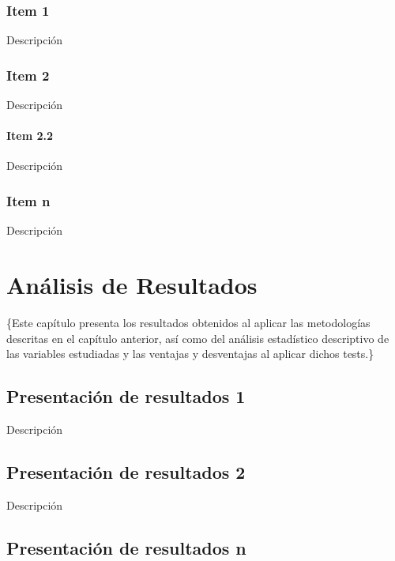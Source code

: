 \documentclass[oneside,11pt]{Latex/Classes/PhDthesisPSnPDF}
\begin{document}
\subsection{Item 1}

Descripción\\

\subsection{Item 2}

Descripción\\

\subsubsection{Item 2.2}

Descripción\\

\subsection{Item n}

Descripción\\

\chapter{Análisis de Resultados}

\{\small Este capítulo presenta los resultados obtenidos al aplicar las
metodologías descritas en el capítulo anterior, así como del análisis
estadístico descriptivo de las variables estudiadas y las ventajas y
desventajas al aplicar dichos tests.\}

\section{Presentación de resultados 1}

Descripción\\

\section{Presentación de resultados 2}

Descripción\\

\section{Presentación de resultados n}
\end{document}
